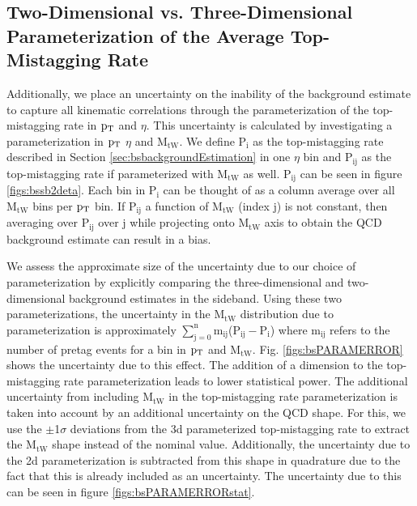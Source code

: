 \subsection{Two-Dimensional  vs. Three-Dimensional Parameterization of the Average Top-Mistagging Rate}
\label{sec:bsparamerrors1}
Additionally, we place an uncertainty on the inability of the
background estimate to capture all kinematic correlations through the
parameterization of the top-mistagging rate in $\mathrm{p_{T}}$ and $\eta$.
This uncertainty is calculated by investigating a parameterization in
$\mathrm{p_{T}}$ $\eta$ and $\mathrm{M_{tW}}$.  We define $\mathrm{P_i}$ as the top-mistagging
rate described in Section \ref{sec:bsbackgroundEstimation} in one
$\eta$ bin and $\mathrm{P_{ij}}$ as the top-mistagging rate if parameterized
with $\mathrm{M_{tW}}$ as well.  $\mathrm{P_{ij}}$ can be seen in
figure \ref{figs:bssb2deta}.  Each bin in $\mathrm{P_i}$ can be thought of as a
column average over all $\mathrm{M_{tW}}$ bins per $\mathrm{p_{T}}$ bin.  If $\mathrm{P_{ij}}$ a
function of $\mathrm{M_{tW}}$ (index $\mathrm{j}$) is not constant, then averaging over
$\mathrm{P_{ij}}$ over $\mathrm{j}$ while projecting onto $\mathrm{M_{tW}}$ axis to obtain the
QCD background estimate can result in a bias.  

We assess the approximate size of the uncertainty due to our choice of
parameterization by explicitly comparing the three-dimensional and
two-dimensional background estimates in the sideband.  Using these two
parameterizations, the uncertainty in the $\mathrm{M_{tW}}$ distribution due to
parameterization is approximately $\mathrm{\displaystyle\sum\limits_{j=0}^n
m_{ij}}$($\mathrm{P_{ij}-P_i}$) where $\mathrm{m_{ij}}$ refers to the number of pretag
events for a bin in $\mathrm{p_{T}}$ and $\mathrm{M_{tW}}$.  Fig. \ref{figs:bsPARAMERROR}
shows the uncertainty due to this effect.  The addition of a dimension to the top-mistagging rate parameterization 
leads to lower statistical power.  The additional uncertainty from including $\mathrm{M_{tW}}$ in the top-mistagging rate 
parameterization is taken into account by an additional uncertainty on the QCD shape.  For this, we use the $\pm$1$\sigma$ deviations from the 3d parameterized top-mistagging rate to 
extract the $\mathrm{M_{tW}}$ shape instead of the nominal value.  Additionally, the uncertainty due to the 2d parameterization is subtracted from this shape in quadrature due to the fact that this is already included as an uncertainty.  
The uncertainty due to this can be seen in figure \ref{figs:bsPARAMERRORstat}.

